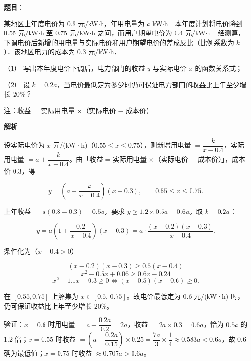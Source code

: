 \begin{answer}

\textbf{题目}：

某地区上年度电价为 $0.8$ 元/kW$\cdot$h，年用电量为 $a$ kW$\cdot$h　本年度计划将电价降到 $0.55$ 元/kW$\cdot$h 至 $0.75$ 元/kW$\cdot$h 之间，而用户期望电价为 $0.4$ 元/kW$\cdot$h　经测算，下调电价后新增的用电量与实际电价和用户期望电价的差成反比（比例系数为 $k$）．该地区电力的成本为 $0.3$ 元/kW$\cdot$h．

（1） 写出本年度电价下调后，电力部门的收益 $y$ 与实际电价 $x$ 的函数关系式；

（2） 设 $k = 0.2a$，当电价最低定为多少时仍可保证电力部门的收益比上年至少增长 $20\%$？

注：收益 = 实际用电量 ×（实际电价 $-$ 成本价）

\textbf{解析}


设实际电价为 $x$ 元/(kW·h)（$0.55\le x\le0.75$），则新增用电量 $=\dfrac{k}{x-0.4}$，实际用电量 $=a+\dfrac{k}{x-0.4}$。由「收益 = 实际用电量 ×（实际电价 $-$ 成本价）」，成本价 $0.3$，得

\nopagebreak[4]
\[y=\left(a+\frac{k}{x-0.4}\right)(x-0.3),\qquad 0.55\le x\le0.75 .\]


上年收益 $=a(0.8-0.3)=0.5a$，要求 $y\ge1.2\times0.5a=0.6a$。取 $k=0.2a$：

\nopagebreak[4]
\[y=a\left(1+\frac{0.2}{x-0.4}\right)(x-0.3)=a\cdot\frac{(x-0.2)(x-0.3)}{x-0.4}.\]

条件化为（$x-0.4>0$）

\nopagebreak[4]
\[(x-0.2)(x-0.3)\ge0.6(x-0.4)\]
\nopagebreak[4]
\[x^2-0.5x+0.06\ge0.6x-0.24\]
\nopagebreak[4]
\[x^2-1.1x+0.3\ge0\iff(x-0.5)(x-0.6)\ge0 .\]

在 $[0.55,0.75]$ 上解集为 $x\in[0.6,\,0.75]$。故电价最低定为 $0.6$ 元/(kW·h) 时，仍可保证收益比上年至少增长 $20\%$。

验证：$x=0.6$ 时用电量 $=a+\dfrac{0.2a}{0.2}=2a$，收益 $=2a\times0.3=0.6a$，恰为 $0.5a$ 的 $1.2$ 倍；$x=0.55$ 时收益 $=\left(a+\dfrac{0.2a}{0.15}\right)\times0.25=\dfrac{7a}{3}\times\dfrac14\approx0.583a<0.6a$，故 $0.6$ 确为最低值；$x=0.75$ 时收益 $\approx0.707a>0.6a$。



\par\medskip

\end{answer}
